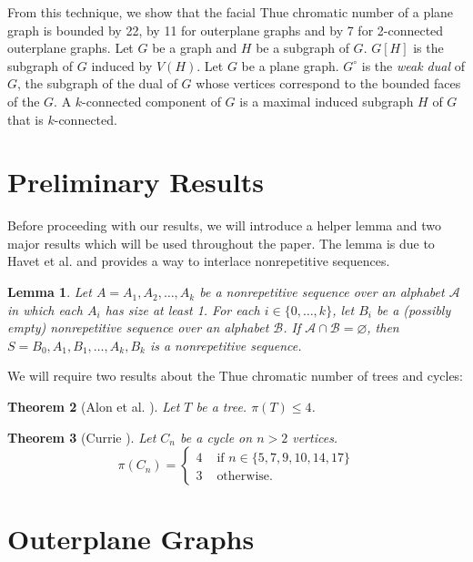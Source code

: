 \documentclass{patmorin}
\let\emptyset\varnothing
\newcommand{\wdual}[1]{#1^{\circ}}
\newtheorem{theorem}{Theorem}[section]
\newtheorem{lemma}[theorem]{Lemma}
\begin{document}
From this technique, we show that the facial Thue chromatic number of a plane graph is bounded by 22, by 11 for outerplane graphs and by 7 for 2-connected outerplane graphs. Let $G$ be a graph and $H$ be a subgraph of $G$. $G[H]$ is the subgraph of $G$ induced by $V(H)$. Let $G$ be a plane graph. $\wdual{G}$ is the \emph{weak dual} of $G$, the subgraph of the dual of $G$ whose vertices correspond to the bounded faces of the $G$. A $k$-connected component of $G$ is a maximal induced subgraph $H$ of $G$ that is $k$-connected.


\section{Preliminary Results}

Before proceeding with our results, we will introduce a helper lemma and two major results which will be used throughout the paper. The lemma is due to Havet et al. \cite{havet2011facial} and provides a way to interlace nonrepetitive sequences.

\begin{lemma}
\label{lem:nonrep_alternate}
 Let $A=A_1,A_2,\ldots,A_k$ be a nonrepetitive sequence over an alphabet $\mathcal{A}$ in which each $A_i$ has size at least 1. For each $i \in \{0,\ldots,k\}$, let $B_i$ be a (possibly empty) nonrepetitive sequence over an alphabet $\mathcal{B}$. If $\mathcal{A} \cap \mathcal{B} = \emptyset$, then
 $ S = B_0, A_1, B_1, \ldots, A_k, B_k$ is a nonrepetitive sequence.
\end{lemma}

We will require two results about the Thue chromatic number of trees and cycles:

\begin{theorem}[Alon et al. \cite{alon2002nonrepetitive}]
 Let $T$ be a tree. $\pi(T) \leq 4$.
 \label{thm:four_colouring_trees}
\end{theorem}

\begin{theorem}[Currie \cite{currie2002cycle18}]
 Let $C_n$ be a cycle on $n > 2$ vertices. 
 $$
 \pi(C_n) = \begin{cases}
             4 & \text{ if } n \in \{5,7,9,10,14,17\} \\
             3 & \text{ otherwise. }
            \end{cases}$$
 \label{thm:colouring_cycles}
\end{theorem}

\section{Outerplane Graphs}
\end{document}
